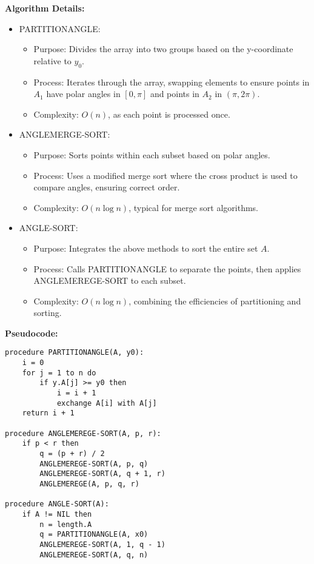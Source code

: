 \textbf{Algorithm Details:}
\begin{itemize}[noitemsep]
    \item PARTITIONANGLE:
        \begin{itemize}[noitemsep]
            \item Purpose: Divides the array into two groups based on the y-coordinate relative to $y_0$.
            \item Process: Iterates through the array, swapping elements to ensure points in $A_1$ have polar angles in $[0, \pi]$ and points in $A_2$ in $(\pi, 2\pi)$.
            \item Complexity: $O(n)$, as each point is processed once.
        \end{itemize}
    \item ANGLEMERGE-SORT:
        \begin{itemize}[noitemsep]
            \item Purpose: Sorts points within each subset based on polar angles.
            \item Process: Uses a modified merge sort where the cross product is used to compare angles, ensuring correct order.
            \item Complexity: $O(n \log n)$, typical for merge sort algorithms.
        \end{itemize}
    \item ANGLE-SORT:
        \begin{itemize}[noitemsep]
            \item Purpose: Integrates the above methods to sort the entire set $A$.
            \item Process: Calls PARTITIONANGLE to separate the points, then applies ANGLEMEREGE-SORT to each subset.
            \item Complexity: $O(n \log n)$, combining the efficiencies of partitioning and sorting.
        \end{itemize}
\end{itemize}

\textbf{Pseudocode:}
\begin{verbatim}
procedure PARTITIONANGLE(A, y0):
    i = 0
    for j = 1 to n do
        if y.A[j] >= y0 then
            i = i + 1
            exchange A[i] with A[j]
    return i + 1

procedure ANGLEMEREGE-SORT(A, p, r):
    if p < r then
        q = (p + r) / 2
        ANGLEMEREGE-SORT(A, p, q)
        ANGLEMEREGE-SORT(A, q + 1, r)
        ANGLEMEREGE(A, p, q, r)

procedure ANGLE-SORT(A):
    if A != NIL then
        n = length.A
        q = PARTITIONANGLE(A, x0)
        ANGLEMEREGE-SORT(A, 1, q - 1)
        ANGLEMEREGE-SORT(A, q, n)
\end{verbatim}

